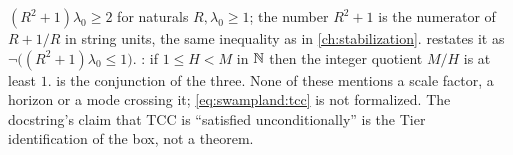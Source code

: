 \begin{leanbox}
$(R^2+1)\lambda_0\ge2$ for naturals $R,\lambda_0\ge1$; the number $R^2+1$ is the numerator of
$R+1/R$ in string units, the same inequality as  in
\cref{ch:stabilization}.  restates it as
$\neg\big((R^2+1)\lambda_0\le1\big)$. : if $1\le H<M$ in
$\mathbb{N}$ then the integer quotient $M/H$ is at least $1$.  is
the conjunction of the three. None of these mentions a scale factor, a horizon or a mode
crossing it; \eqref{eq:swampland:tcc} is not formalized. The docstring's claim that TCC is
``satisfied unconditionally'' is the Tier~\TC{} identification of the box, not a theorem.
\end{leanbox}

